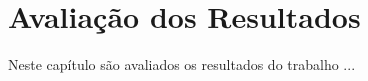 \chapter{Avaliação dos Resultados}

Neste capítulo são avaliados os resultados do trabalho ...

\lipsum[3]
